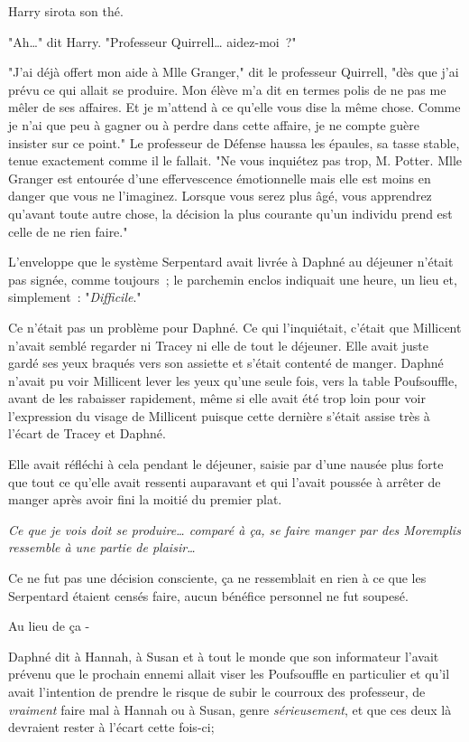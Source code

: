 Harry sirota son thé.

"Ah…" dit Harry. "Professeur Quirrell… aidez-moi~?"

"J'ai déjà offert mon aide à Mlle Granger," dit le professeur Quirrell, "dès que j'ai prévu ce qui allait se produire. Mon élève m'a dit en termes polis de ne pas me mêler de ses affaires. Et je m'attend à ce qu'elle vous dise la même chose. Comme je n'ai que peu à gagner ou à perdre dans cette affaire, je ne compte guère insister sur ce point." Le professeur de Défense haussa les épaules, sa tasse stable, tenue exactement comme il le fallait. "Ne vous inquiétez pas trop, M. Potter. Mlle Granger est entourée d'une effervescence émotionnelle mais elle est moins en danger que vous ne l'imaginez. Lorsque vous serez plus âgé, vous apprendrez qu'avant toute autre chose, la décision la plus courante qu'un individu prend est celle de ne rien faire."

\later

L'enveloppe que le système Serpentard avait livrée à Daphné au déjeuner n'était pas signée, comme toujours~; le parchemin enclos indiquait une heure, un lieu et, simplement~: "\emph{Difficile}."

Ce n'était pas un problème pour Daphné. Ce qui l'inquiétait, c'était que Millicent n'avait semblé regarder ni Tracey ni elle de tout le déjeuner. Elle avait juste gardé ses yeux braqués vers son assiette et s'était contenté de manger. Daphné n'avait pu voir Millicent lever les yeux qu'une seule fois, vers la table Poufsouffle, avant de les rabaisser rapidement, même si elle avait été trop loin pour voir l'expression du visage de Millicent puisque cette dernière s'était assise très à l'écart de Tracey et Daphné.

Elle avait réfléchi à cela pendant le déjeuner, saisie par d'une nausée plus forte que tout ce qu'elle avait ressenti auparavant et qui l'avait poussée à arrêter de manger après avoir fini la moitié du premier plat.

\emph{Ce que je vois doit se produire… comparé à ça, se faire manger par des Moremplis ressemble à une partie de plaisir…}

Ce ne fut pas une décision consciente, ça ne ressemblait en rien à ce que les Serpentard étaient censés faire, aucun bénéfice personnel ne fut soupesé.

Au lieu de ça -

Daphné dit à Hannah, à Susan et à tout le monde que son informateur l'avait prévenu que le prochain ennemi allait viser les Poufsouffle en particulier et qu'il avait l'intention de prendre le risque de subir le courroux des professeur, de \emph{vraiment} faire mal à Hannah ou à Susan, genre \emph{sérieusement}, et que ces deux là devraient rester à l'écart cette fois-ci;

